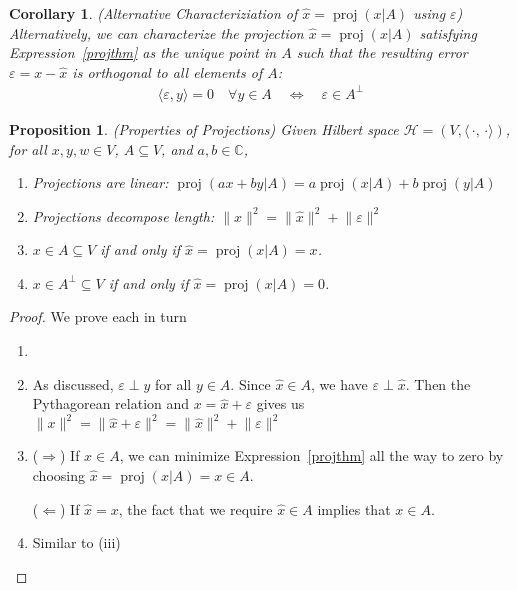 \documentclass[12pt]{article}
\numberwithin{equation}{section} %
\theoremstyle{plain}
\newtheorem{prop}[thm]{Proposition}
\newtheorem{cor}[thm]{Corollary}
\theoremstyle{definition}
\theoremstyle{remark}
\newcommand{\proj}{\operatorname{proj}}
\newcommand{\calH}{\mathcal{H}}
\newcommand{\C}{\mathbb{C}}
\begin{document}
\begin{cor}
\emph{(Alternative Characteriziation of $\hat{x}=\proj(x|A)$ using
$\varepsilon$)}
Alternatively, we can characterize the projection $\hat{x}=\proj(x|A)$
satisfying Expression~\ref{projthm} as the unique point in $A$ such that
the resulting error $\varepsilon=x-\hat{x}$ is orthogonal to all
elements of $A$:
\begin{align*}
  \langle \varepsilon, y\rangle =0
  \quad\forall y\in A
  \quad\iff\quad
  \varepsilon\in A^\perp
\end{align*}
\end{cor}

\begin{prop}\emph{(Properties of Projections)}
Given Hilbert space $\calH=(V,\langle\,\cdot,\,\cdot\rangle)$,
for all $x,y,w\in V$, $A\subseteq V$, and $a,b\in\C$,
\begin{enumerate}[label=\emph{(\roman*)}]
  \item \emph{Projections are linear}:
    $\proj(ax+by|A) = a\proj(x|A)+b\proj(y|A)$
  \item \emph{Projections decompose length}:
    $\lVert x\rVert^2
    = \lVert\hat{x}\rVert^2 + \lVert \varepsilon\rVert^2$
  \item $x\in A\subseteq V$ if and only if $\hat{x}=\proj(x|A)=x$.
  \item $x\in A^\perp \subseteq V$ if and only if
    $\hat{x}=\proj(x|A)=0$.
\end{enumerate}
\end{prop}
\clearpage
\begin{proof}
We prove each in turn
\begin{enumerate}[label=(\roman*)]
  \item
  \item As discussed, $\varepsilon\perp y$ for all $y\in A$.
    Since $\hat{x}\in A$, we have $\varepsilon\perp \hat{x}$.
    Then the Pythagorean relation and $x=\hat{x}+\varepsilon$ gives us
    $\lVert x\rVert^2 = \lVert \hat{x}+\varepsilon\rVert^2 =\lVert
    \hat{x}\rVert^2 + \lVert \varepsilon\rVert^2$
  \item
    ($\Rightarrow$)
    If $x\in A$, we can minimize Expression~\ref{projthm}
    all the way to zero by choosing $\hat{x}=\proj(x|A)=x\in A$.

    ($\Leftarrow$) If $\hat{x}=x$, the fact that we require
    $\hat{x}\in A$ implies that $x\in A$.
  \item Similar to (iii)
\end{enumerate}
\end{proof}
\end{document}
